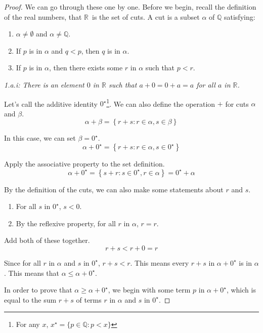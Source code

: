 \documentclass[11pt]{article}
\newcommand{\cut}[1]{\ensuremath{#1^\star}}
\newcommand{\mbbR}{\ensuremath{\mathbb{R}}}
\begin{document}
\begin{proof}
    We can go through these one by one.
    Before we begin, recall the definition of the real numbers, that \mbbR\ is the set of cuts.
    A cut is a subset $\alpha$ of $\mathbb{Q}$ satisfying:
    \begin{enumerate}
        \item   $\alpha \neq \emptyset$ and $\alpha \neq \mathbb{Q}$.
        \item   If $p$ is in $\alpha$ and $q < p$, then $q$ is in $\alpha$.
        \item   If $p$ is in $\alpha$, then there exists some $r$ in $\alpha$ such that $p < r$.
    \end{enumerate}
    
    \begin{center}
        \textit{1.a.i: There is an element $0$ in $\mathbb{R}$ such that $a + 0 = 0 + a = a$ for all $a$ in $\mathbb{R}$.}
    \end{center}
        Let's call the additive identity $0^\star$\footnote{For any $x$, $x^\star = \{p \in \mathbb{Q} : p < x\}$}.
        We can also define the operation $+$ for cuts $\alpha$ and $\beta$.
        \begin{equation}
            \alpha + \beta = \left\{ r + s : r \in \alpha, s \in \beta \right\}
        \end{equation}

        In this case, we can set $\beta = 0^\star$.
        \begin{equation}
            \alpha + 0^\star = \left\{ r + s : r \in \alpha, s \in \cut{0} \right\}
        \end{equation}

        Apply the associative property to the set definition.
        \begin{equation}
            \alpha + 0^\star = \left\{ s + r : s \in \cut{0}, r \in \alpha \right\} = \cut{0} + \alpha
        \end{equation}

        By the definition of the cuts, we can also make some statements about $r$ and $s$.
        \begin{enumerate}
            \item   For all $s$ in \cut{0}, $s < 0$.
            \item   By the reflexive property, for all $r$ in $\alpha$, $r = r$.
        \end{enumerate}
        Add both of these together.
        \begin{equation}
            r + s < r + 0 = r
        \end{equation}

        Since for all $r$ in $\alpha$ and $s$ in \cut{0}, $r + s < r$.
        This means every $r + s$ in $\alpha + \cut{0}$ is in $\alpha$.
        This means that $\alpha \leq \alpha + \cut{0}$.

        In order to prove that $\alpha \geq \alpha + \cut{0}$, we begin with some term $p$ in $\alpha + \cut{0}$, which is equal to the sum $r + s$ of terms $r$ in $\alpha$ and $s$ in \cut{0}.
\end{proof}
\end{document}
